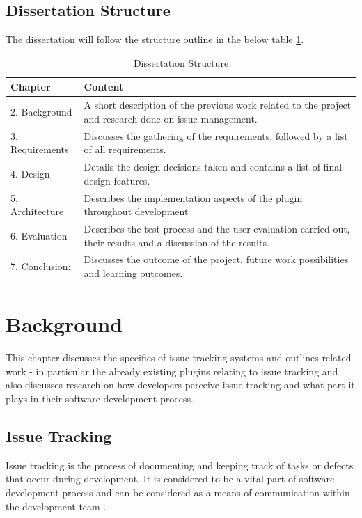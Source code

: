 \documentclass{4thYearProject}
\begin{document}
\section{Dissertation Structure}

The dissertation will follow the structure outline in the below table \ref{table:reportStructure}.

\begin{table}[H]
\centering
\def\arraystretch{1.5}
\begin{tabular}{p{3cm}p{12cm}}
\hline
Chapter & Content \\
\hline
2. Background & A short description of the previous work related to the project and research done on issue management. \\
3. Requirements & Discusses the gathering of the requirements, followed by a list of all requirements. \\
4. Design & Details the design decisions taken and contains a list of final design features.\\
5. Architecture & Describes the implementation aspects of the plugin throughout development\\
6. Evaluation & Describes the test process and the user evaluation carried out, their results and a discussion of the results. \\
7. Conclusion: & Discusses the outcome of the project, future work possibilities and learning outcomes.  \\
\hline
\end{tabular}
\caption{Dissertation Structure}
\label{table:reportStructure}
\end{table}


\chapter{Background}

This chapter discusses the specifics of issue tracking systems and outlines related work - in particular the already existing plugins relating to issue tracking and also discusses research on how developers perceive issue tracking and what part it plays in their software development process.

\section{Issue Tracking}

Issue tracking is the process of documenting and keeping track of tasks or defects that occur during development. It is considered to be a vital part of software development process and can be considered as a means of communication within the development team \cite{socialnature}.
\end{document}
